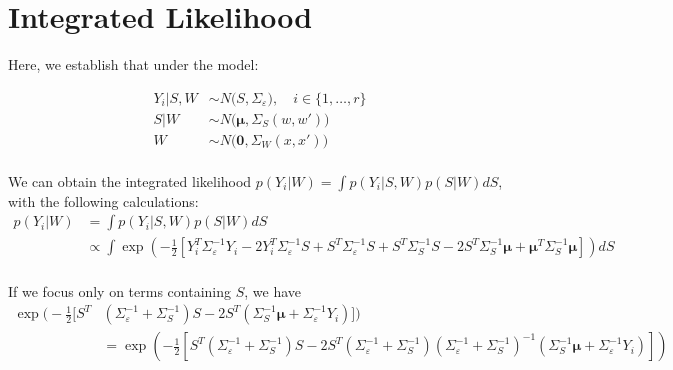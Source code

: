 \documentclass[11pt]{article}
\begin{document}
\appendix
\renewcommand{\thesection}{Appendix \Alph{section}}

\section{Integrated Likelihood}
\label{sec:apdx_int_lik}
Here, we establish that under the model:

$$
\begin{aligned}
Y_i|S,W &\sim N\big(S, \Sigma_\varepsilon\big), \quad i \in \{1,\dots, r\}\\
S|W &\sim N\big(\boldsymbol{\mu}, \Sigma_S(w,w')\big)\\
W &\sim N\big(\mathbf{0}, \Sigma_W(x,x')\big) \\
\end{aligned}
$$

We can obtain the integrated likelihood $p(Y_i|W)=\int p(Y_i|S,W)p(S|W) dS$, 
with the following calculations:
$$
\begin{aligned}
p(Y_i|W) &= \int p(Y_i|S,W)p(S|W)dS \\
&\propto \int\exp\left(-\frac{1}{2} \left[Y_i^T\Sigma_\varepsilon^{-1} Y_i 
- 2Y_i^T\Sigma_\varepsilon^{-1} S + S^T \Sigma_\varepsilon^{-1} S + S^T \Sigma_S^{-1} S 
-2S^T \Sigma_S^{-1} \boldsymbol{\mu} 
+ \boldsymbol{\mu}^T \Sigma_S^{-1} \boldsymbol{\mu} \right]\right)dS \\
\end{aligned}
$$

If we focus only on terms containing $S$, we have 
$$
\begin{aligned}
    \exp\Big(-\frac{1}{2} \big[S^T &(\Sigma_\varepsilon^{-1}+\Sigma_S^{-1}) S 
    -2S^T (\Sigma_S^{-1} \boldsymbol{\mu} + \Sigma_\varepsilon^{-1} Y_i) \big]\Big) \\
&= \exp\left(-\frac{1}{2} \left[S^T (\Sigma_\varepsilon^{-1}+\Sigma_S^{-1}) S 
-2S^T (\Sigma_\varepsilon^{-1}+\Sigma_S^{-1})(\Sigma_\varepsilon^{-1}
+\Sigma_S^{-1})^{-1}(\Sigma_S^{-1} \boldsymbol{\mu} + \Sigma_\varepsilon^{-1} Y_i) \right]\right)
\end{aligned}
$$
\end{document}

